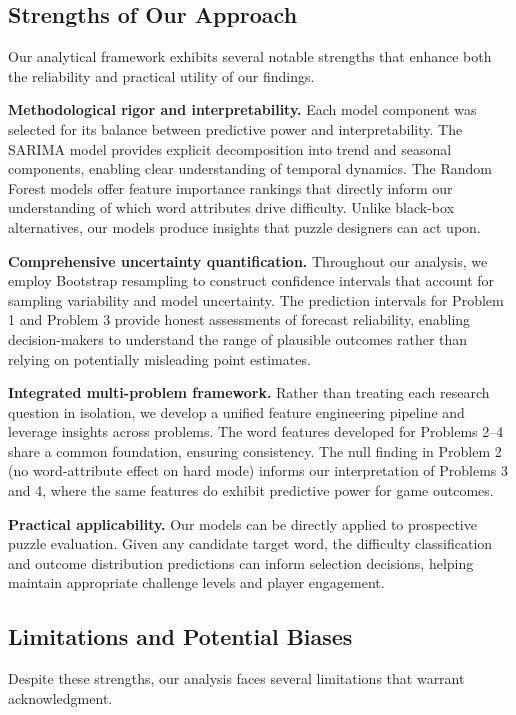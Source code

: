 \documentclass{mcmthesis}
\begin{document}
\subsection{Strengths of Our Approach}

Our analytical framework exhibits several notable strengths that enhance both the reliability and practical utility of our findings.

\textbf{Methodological rigor and interpretability.} Each model component was selected for its balance between predictive power and interpretability. The SARIMA model provides explicit decomposition into trend and seasonal components, enabling clear understanding of temporal dynamics. The Random Forest models offer feature importance rankings that directly inform our understanding of which word attributes drive difficulty. Unlike black-box alternatives, our models produce insights that puzzle designers can act upon.

\textbf{Comprehensive uncertainty quantification.} Throughout our analysis, we employ Bootstrap resampling to construct confidence intervals that account for sampling variability and model uncertainty. The prediction intervals for Problem 1 and Problem 3 provide honest assessments of forecast reliability, enabling decision-makers to understand the range of plausible outcomes rather than relying on potentially misleading point estimates.

\textbf{Integrated multi-problem framework.} Rather than treating each research question in isolation, we develop a unified feature engineering pipeline and leverage insights across problems. The word features developed for Problems 2--4 share a common foundation, ensuring consistency. The null finding in Problem 2 (no word-attribute effect on hard mode) informs our interpretation of Problems 3 and 4, where the same features do exhibit predictive power for game outcomes.

\textbf{Practical applicability.} Our models can be directly applied to prospective puzzle evaluation. Given any candidate target word, the difficulty classification and outcome distribution predictions can inform selection decisions, helping maintain appropriate challenge levels and player engagement.

\subsection{Limitations and Potential Biases}

Despite these strengths, our analysis faces several limitations that warrant acknowledgment.
\end{document}
